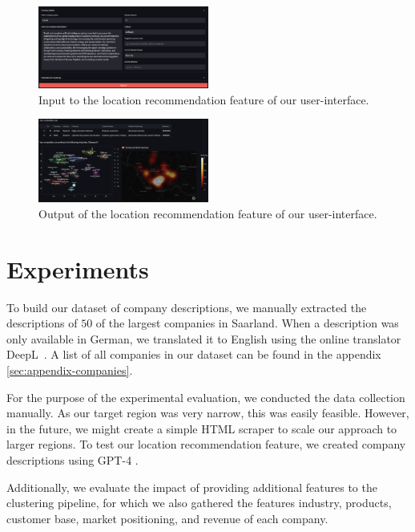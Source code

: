 \documentclass[conference]{IEEEtran}
\begin{document}
\begin{figure}[H]
	\centering
	\includegraphics[width=0.5\textwidth]{figures/location_recommendation_input.png}
	\caption{Input to the location recommendation feature of our user-interface.}
	\label{fig:location-recommendation-input}
\end{figure}
\begin{figure}[H]
	\centering
	\includegraphics[width=0.5\textwidth]{figures/location_recommendation_output.png}
	\caption{Output of the location recommendation feature of our user-interface.}
	\label{fig:location-recommendation-output}
\end{figure}

\section{Experiments}
To build our dataset of company descriptions, we manually extracted the descriptions of $50$ of the largest companies in Saarland. When a description was only available in German, we translated it to English using the online translator DeepL~\cite{deepl}. A list of all companies in our dataset can be found in the appendix \ref{sec:appendix-companies}.

For the purpose of the experimental evaluation, we conducted the data collection manually. As our target region was very narrow, this was easily feasible. However, in the future, we might create a simple HTML scraper to scale our approach to larger regions. To test our location recommendation feature, we created company descriptions using GPT-4 \cite{chatgpt}.

Additionally, we evaluate the impact of providing additional features to the clustering pipeline, for which we also gathered the features industry, products, customer base, market positioning, and revenue of each company.
\end{document}
